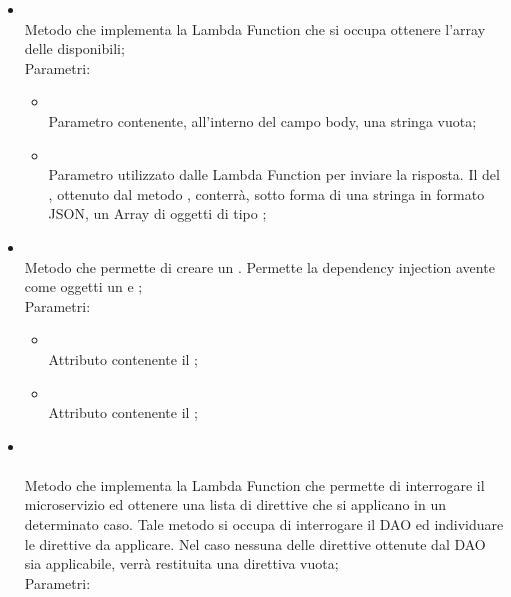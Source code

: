 \begin{itemize}
\begin{itemize}
\begin{itemize}
		\end{itemize}
		\item[]  \\		Metodo che implementa la Lambda Function che si occupa ottenere l'array delle  disponibili;\\
		Parametri:
		\begin{itemize}
			\item {} \\
			Parametro contenente, all'interno del campo body, una stringa vuota;
			\item {} \\
			Parametro utilizzato dalle Lambda Function per inviare la risposta. Il  del , ottenuto dal metodo , conterrà, sotto forma di una stringa in formato JSON,  un Array di oggetti di tipo ;
		\end{itemize}
		\item[]  \\		Metodo che permette di creare un . Permette la dependency injection avente come oggetti un  e ;\\
		Parametri:
		\begin{itemize}
			\item {} \\
			Attributo contenente il ;
			\item {} \\
			Attributo contenente il ;
		\end{itemize}
		\item[]  \\\\		Metodo che implementa la Lambda Function che permette di interrogare il microservizio ed ottenere una lista di direttive che si applicano in un determinato caso.
Tale metodo si occupa di interrogare il DAO ed individuare le direttive da applicare. Nel caso nessuna delle direttive ottenute dal DAO sia applicabile, verrà restituita una direttiva vuota;\\
		Parametri:
		\begin{itemize}

\end{itemize}
\end{itemize}
\end{itemize}
